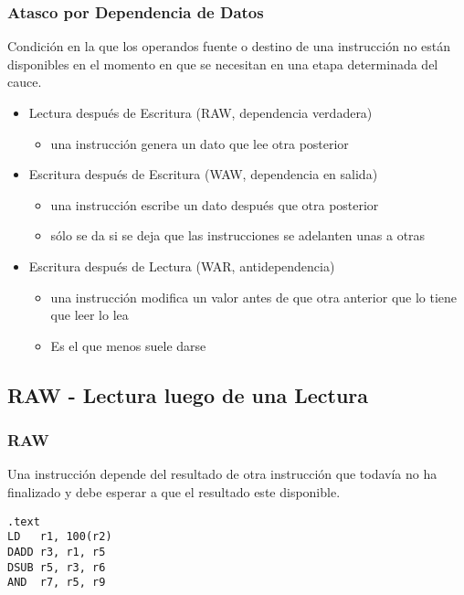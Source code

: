 \documentclass{beamer}
\begin{document}
\begin{frame}
\frametitle{Atasco por Dependencia de Datos}

Condición en la que los operandos fuente o destino de una instrucción no están disponibles en el momento en que se necesitan en una etapa determinada del cauce.
\begin{itemize}

\item Lectura después de Escritura (RAW, dependencia verdadera)
\begin{itemize}
\item  una instrucción genera un dato que lee otra posterior
\end{itemize}

\item Escritura después de Escritura (WAW, dependencia en salida)
\begin{itemize}
\item una instrucción escribe un dato después que otra posterior
\item sólo se da si se deja que las instrucciones se adelanten unas a otras
\end{itemize}

\item Escritura después de Lectura (WAR, antidependencia)
\begin{itemize}
\item una instrucción modifica un valor antes de que otra anterior que lo tiene que leer lo lea
\item Es el que menos suele darse
\end{itemize}
\end{itemize}
\end{frame}

\subsection{RAW - Lectura luego de una Lectura}
\begin{frame}[fragile]
\frametitle{RAW}
Una instrucción depende del resultado de otra instrucción que todavía no ha finalizado y debe esperar a que el resultado este disponible.
\begin{block}{}
\begin{lstlisting}[language=WinMIPS64,basicstyle=\ttfamily,keywordstyle=\color{blue}]
.text
LD   r1, 100(r2)
DADD r3, r1, r5
DSUB r5, r3, r6
AND  r7, r5, r9
\end{lstlisting}
\end{block}

\end{frame}
\end{document}

